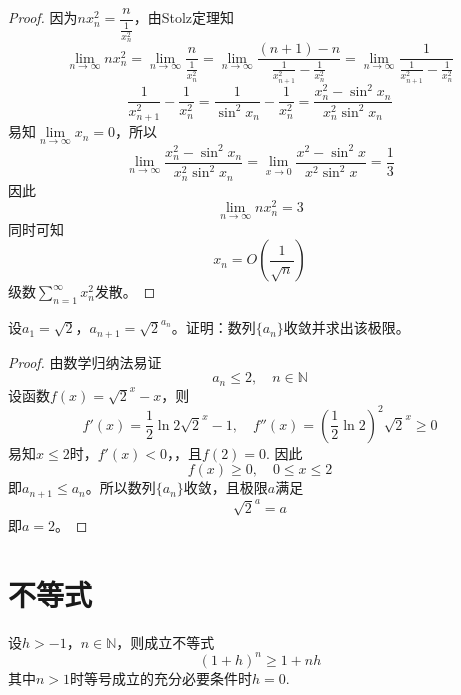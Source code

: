 \begin{proof}

    因为$nx_n^2 = \dfrac{n}{\frac{1}{x_n^2}}$，由\textup{Stolz}定理知
    $$\lim\limits_{n \to\infty}{nx_n^2} = \lim\limits_{n\to\infty}{\dfrac{n}{\frac{1}{x_n^2}}} = \lim\limits_{n \to \infty}{\dfrac{(n + 1) - n}{\frac{1}{x_{n + 1}^2} - \frac{1}{x_n^2}}} = \lim\limits_{n \to \infty}{\dfrac{1}{\frac{1}{x_{n + 1}^2} - \frac{1}{x_n^2}}}$$
    $$\dfrac{1}{x_{n + 1}^2} - \dfrac{1}{x_n^2} = \dfrac{1}{\sin^2 x_n} - \dfrac{1}{x_n^2} = \dfrac{x_n^2 - \sin^2 x_n}{x_n^2 \sin^2 x_n}$$
    易知$\lim\limits_{n\to\infty}{x_n} = 0$，所以
    $$\lim\limits_{n \to \infty}{\dfrac{x_n^2 - \sin^2 x_n}{x_n^2 \sin^2 x_n}} = \lim\limits_{x \to 0}{\dfrac{x^2 - \sin^2 x}{x^2 \sin^2 x}} = \dfrac{1}{3}$$
    因此
    $$\lim\limits_{n \to\infty}{nx_n^2} = 3$$
    同时可知
    $$x_n = O(\dfrac{1}{\sqrt{n}})$$
    级数$\sum\limits_{n = 1}^{\infty}{x_n^2}$发散。

\end{proof}

\begin{proposition}

    设$a_1 = \sqrt{2}$，$a_{n + 1} = {\sqrt{2}}^{a_n}$。证明：数列$\{a_n\}$收敛并求出该极限。

\end{proposition}

\begin{proof}

    由数学归纳法易证
    $$a_n \leq 2, \quad n \in \mathbb{N}$$
    设函数$f(x) = {\sqrt{2}}^x - x$，则
    $$f'(x) = \dfrac{1}{2}\ln2 {\sqrt{2}}^x - 1, \quad f''(x) = \left(\dfrac{1}{2}\ln 2 \right)^2 {\sqrt{2}}^x \geq 0$$
    易知$x \leq 2$时，$f'(x) < 0$，，且$f(2) = 0$. 因此
    $$f(x) \geq 0, \quad 0 \leq x \leq 2$$
    即$a_{n + 1} \leq a_n$。所以数列$\{a_n\}$收敛，且极限$a$满足
    $${\sqrt{2}}^{a} = a$$
    即$a = 2$。

\end{proof}

\section{不等式}

\begin{theorem}[Bernoulli不等式]

    设$h>-1$，$n\in\mathbb{N}$，则成立不等式
    $$(1+h)^n\geq1+nh$$
    其中$n>1$时等号成立的充分必要条件时$h=0$.

\end{theorem}

